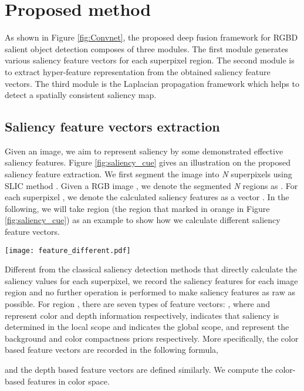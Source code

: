 \documentclass[journal]{IEEEtran}
\begin{document}
\section{Proposed method}
As shown in Figure \ref{fig:Convnet}, the proposed deep fusion framework for RGBD salient object detection composes of three modules. The first module generates various saliency feature vectors for each superpixel region. The second module is to extract hyper-feature representation from the obtained saliency feature vectors. The third module is the Laplacian propagation framework which helps to detect a spatially consistent saliency map.

\subsection{Saliency feature vectors extraction}\label{title_3_1}
Given an image, we aim to represent saliency by some demonstrated effective saliency features.
Figure \ref{fig:saliency_cue} gives an illustration on the proposed saliency feature extraction. We first segment the image into \emph{N} superpixels using SLIC method \cite{achanta2012slic}. Given a RGB image , we denote the segmented \emph{N} regions as . For each superpixel , we denote the calculated saliency features as a vector .
In the following, we will take region  (the region that marked in orange in Figure \ref{fig:saliency_cue}) as an example to show how we calculate different saliency feature vectors.
\begin{figure*}[t]
\centering
\texttt{[image: feature\_different.pdf]}

   \caption{Saliency feature extraction.}
\label{fig:saliency_cue}
\vspace{-1.0mm}
\end{figure*}

Different from the classical saliency detection methods that directly calculate the saliency values for each superpixel, we record the saliency features for each image region and no further operation is performed to make saliency features as raw as possible. For region , there are seven types of feature vectors: , where  and  represent color and depth information respectively,  indicates that saliency is determined in the local scope and  indicates the global scope,  and  represent the background and color compactness priors respectively. More specifically, the color based feature vectors are recorded in the following formula,

and the depth based feature vectors are defined similarly. We compute the color-based features in  color space.
\end{document}
